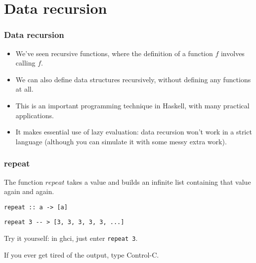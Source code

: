 \documentclass{beamer}
\begin{document}
\section{Data recursion}

\begin{frame}[fragile]
\frametitle{Data recursion}

\begin{itemize}
\item We've seen recursive functions, where the definition of a
  function $f$ involves calling $f$.
\item We can also define data structures recursively, without
  defining any functions at all.
\item This is an important programming technique in Haskell, with
  many practical applications.
\item It makes essential use of lazy evaluation: data recursion
  won't work in a strict language (although you can simulate it
  with some messy extra work).
\end{itemize}

\end{frame}

\begin{frame}[fragile]
\frametitle{repeat}

The function $repeat$ takes a value and builds an infinite list
containing that value again and again.

\begin{verbatim}
repeat :: a -> [a]
\end{verbatim}

\begin{verbatim}
repeat 3 -- > [3, 3, 3, 3, 3, ...]
\end{verbatim}

Try it yourself: in ghci, just enter {\tt repeat 3}.

\vspace{1em}

If you ever get tired of the output, type Control-C.

\end{frame}
\end{document}
